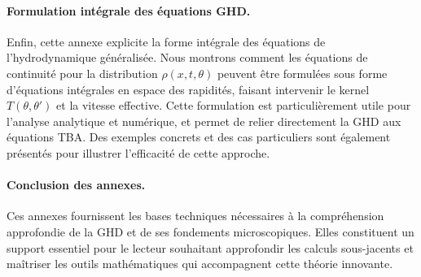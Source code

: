\paragraph{Formulation intégrale des équations GHD.}
Enfin, cette annexe explicite la forme intégrale des équations de l’hydrodynamique généralisée. Nous montrons comment les équations de continuité pour la distribution $\rho(x,t,\theta)$ peuvent être formulées sous forme d’équations intégrales en espace des rapidités, faisant intervenir le kernel $T(\theta,\theta')$ et la vitesse effective. Cette formulation est particulièrement utile pour l’analyse analytique et numérique, et permet de relier directement la GHD aux équations TBA. Des exemples concrets et des cas particuliers sont également présentés pour illustrer l’efficacité de cette approche.

\paragraph{Conclusion des annexes.}
Ces annexes fournissent les bases techniques nécessaires à la compréhension approfondie de la GHD et de ses fondements microscopiques. Elles constituent un support essentiel pour le lecteur souhaitant approfondir les calculs sous-jacents et maîtriser les outils mathématiques qui accompagnent cette théorie innovante.

